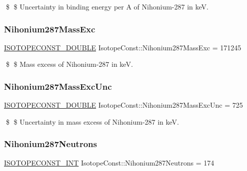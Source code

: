 \$ \$ Uncertainty in binding energy per A of Nihonium-\/287 in keV. \mbox{\label{group___isotope_const-_nihonium-_nh287_ga0da25ee7cfef5eef2e46643e8fed6a23}} 
\subsubsection{\texorpdfstring{Nihonium287\+Mass\+Exc}{Nihonium287MassExc}}
{\footnotesize\ttfamily \mbox{\hyperlink{group___isotope_const-_macros_ga8f45a7272ce02c0b4c65c44636ed719a}{I\+S\+O\+T\+O\+P\+E\+C\+O\+N\+S\+T\+\_\+\+D\+O\+U\+B\+LE}} Isotope\+Const\+::\+Nihonium287\+Mass\+Exc = 171245}

\$ \$ Mass excess of Nihonium-\/287 in keV. \mbox{\label{group___isotope_const-_nihonium-_nh287_ga73fcc3515a4a62828cd16b003e823664}} 
\subsubsection{\texorpdfstring{Nihonium287\+Mass\+Exc\+Unc}{Nihonium287MassExcUnc}}
{\footnotesize\ttfamily \mbox{\hyperlink{group___isotope_const-_macros_ga8f45a7272ce02c0b4c65c44636ed719a}{I\+S\+O\+T\+O\+P\+E\+C\+O\+N\+S\+T\+\_\+\+D\+O\+U\+B\+LE}} Isotope\+Const\+::\+Nihonium287\+Mass\+Exc\+Unc = 725}

\$ \$ Uncertainty in mass excess of Nihonium-\/287 in keV. \mbox{\label{group___isotope_const-_nihonium-_nh287_ga82f534fb4eec20044cefa6db3bf779c7}} 
\subsubsection{\texorpdfstring{Nihonium287\+Neutrons}{Nihonium287Neutrons}}
{\footnotesize\ttfamily \mbox{\hyperlink{group___isotope_const-_macros_ga5f18360b3e99483a35c32d789e62621c}{I\+S\+O\+T\+O\+P\+E\+C\+O\+N\+S\+T\+\_\+\+I\+NT}} Isotope\+Const\+::\+Nihonium287\+Neutrons = 174}

